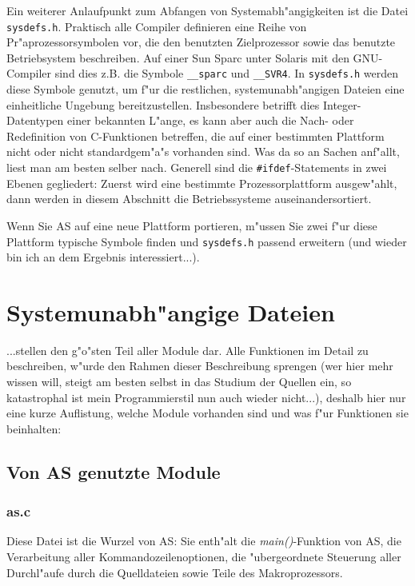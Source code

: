 \documentclass[12pt,a4paper,twoside]{report}
\begin{document}
Ein weiterer Anlaufpunkt zum Abfangen von Systemabh"angigkeiten ist die
Datei {\tt sysdefs.h}.  Praktisch alle Compiler definieren eine Reihe von
Pr"aprozessorsymbolen vor, die den benutzten Zielprozessor sowie das
benutzte Betriebsystem beschreiben.  Auf einer Sun Sparc unter Solaris
mit den GNU-Compiler sind dies z.B. die Symbole \verb!__sparc! und
\verb!__SVR4!.  In {\tt sysdefs.h} werden diese Symbole genutzt, um f"ur
die restlichen, systemunabh"angigen Dateien eine einheitliche Ungebung
bereitzustellen.  Insbesondere betrifft dies Integer-Datentypen einer
bekannten L"ange, es kann aber auch die Nach- oder Redefinition von
C-Funktionen betreffen, die auf einer bestimmten Plattform nicht oder
nicht standardgem"a"s vorhanden sind.  Was da so an Sachen anf"allt, liest
man am besten selber nach.  Generell sind die \verb!#ifdef!-Statements in
zwei Ebenen gegliedert: Zuerst wird eine bestimmte Prozessorplattform
ausgew"ahlt, dann werden in diesem Abschnitt die Betriebssysteme
auseinandersortiert.

Wenn Sie AS auf eine neue Plattform portieren, m"ussen Sie zwei f"ur diese
Plattform typische Symbole finden und {\tt sysdefs.h} passend erweitern
(und wieder bin ich an dem Ergebnis interessiert...).


\section{Systemunabh"angige Dateien}

...stellen den g"o"sten Teil aller Module dar.  Alle Funktionen im Detail
zu beschreiben, w"urde den Rahmen dieser Beschreibung sprengen (wer hier
mehr wissen will, steigt am besten selbst in das Studium der Quellen ein,
so katastrophal ist mein Programmierstil nun auch wieder nicht...),
deshalb hier nur eine kurze Auflistung, welche Module vorhanden sind und
was f"ur Funktionen sie beinhalten:

\subsection{Von AS genutzte Module}

\subsubsection{as.c}

Diese Datei ist die Wurzel von AS: Sie enth"alt die {\em main()}-Funktion
von AS, die Verarbeitung aller Kommandozeilenoptionen, die "ubergeordnete
Steuerung aller Durchl"aufe durch die Quelldateien sowie Teile des
Makroprozessors.
\end{document}
